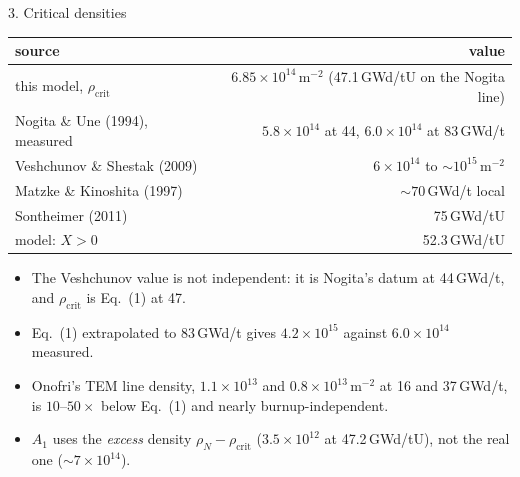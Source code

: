 \documentclass[10pt,aspectratio=169]{beamer}
\begin{document}
\begin{frame}{3. Critical densities}
  \small
  \begin{center}
  \begin{tabular}{lr}
    \toprule
    source & value \\
    \midrule
    this model, $\rho_{\text{crit}}$ & $6.85\times10^{14}$\,m$^{-2}$ (47.1\,GWd/tU on the Nogita line) \\
    Nogita \& Une (1994), measured & $5.8\times10^{14}$ at 44, $6.0\times10^{14}$ at 83\,GWd/t \\
    Veshchunov \& Shestak (2009) & $6\times10^{14}$ to $\sim10^{15}$\,m$^{-2}$ \\
    Matzke \& Kinoshita (1997) & $\sim70$\,GWd/t local \\
    Sontheimer (2011) & 75\,GWd/tU \\
    model: $X>0$ & 52.3\,GWd/tU \\
    \bottomrule
  \end{tabular}
  \end{center}
  \footnotesize
  \begin{itemize}
    \item The Veshchunov value is \alert{not independent}: it is Nogita's datum at 44\,GWd/t, and $\rho_{\text{crit}}$ is Eq.~(1) at 47.
    \item Eq.~(1) extrapolated to 83\,GWd/t gives $4.2\times10^{15}$ against $6.0\times10^{14}$ measured.
    \item Onofri's TEM line density, $1.1\times10^{13}$ and $0.8\times10^{13}$\,m$^{-2}$ at 16 and 37\,GWd/t, is $10$--$50\times$
      below Eq.~(1) and nearly burnup-independent.
    \item $A_1$ uses the \emph{excess} density $\rho_N-\rho_{\text{crit}}$ ($3.5\times10^{12}$ at 47.2\,GWd/tU), not the real one ($\sim7\times10^{14}$).
  \end{itemize}
\end{frame}
\end{document}
